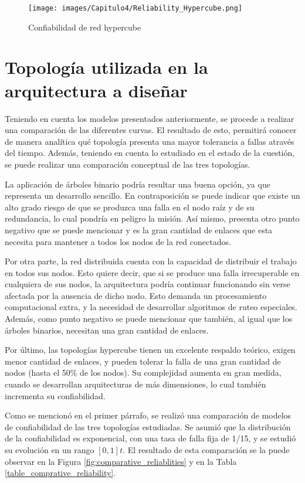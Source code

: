 \begin{figure}[H]
 \centering
 \texttt{[image: images/Capitulo4/Reliability\_Hypercube.png]}
  \caption{Confiabilidad de red hypercube}
\label{fig:Reliability_Hypercube}
\end{figure}

\section{Topología utilizada en la arquitectura a diseñar}

Teniendo en cuenta los modelos presentados anteriormente, se procede a realizar una comparación de las diferentes curvas. El resultado de esto, permitirá conocer de manera analítica qué topología presenta una mayor tolerancia a fallas através del tiempo. Además, teniendo en cuenta lo estudiado en el estado de la cuestión, se puede realizar una comparación conceptual de las tres topologías.

La aplicación de árboles binario podría resultar una buena opción, ya que representa un desarrollo sencillo. En contraposición se puede indicar que existe un alto grado riesgo de que se produzca una falla en el nodo raíz y de su redundancia, lo cual pondría en peligro la misión. Así mismo, presenta otro punto negativo que se puede mencionar y es la gran cantidad de enlaces que esta necesita para mantener a todos los nodos de la red conectados.

Por otra parte, la red distribuida cuenta con la capacidad de distribuir el trabajo en todos sus nodos. Esto quiere decir, que si se produce una falla irrecuperable en cualquiera de sus nodos, la arquitectura podría continuar funcionando sin verse afectada por la ausencia de dicho nodo. Esto demanda un procesamiento computacional extra, y la necesidad de desarrollar algoritmos de ruteo especiales. Además, como punto negativo se puede mencionar que también, al igual que los árboles binarios, necesitan una gran cantidad de enlaces.

Por último, las topologías hypercube tienen un excelente respaldo teórico, exigen menor cantidad de enlaces, y pueden tolerar la falla de una gran cantidad de nodos (hasta el 50\% de los nodos). Su complejidad aumenta en gran medida, cuando se desarrollan arquitecturas de más dimensiones, lo cual también incrementa su confiabilidad.

Como se mencionó en el primer párrafo, se realizó una comparación de modelos de confiabilidad de las tres topologías estudiadas. Se asumió que la distribución de la confiabilidad es exponencial, con una tasa de falla fija de 1/15, y se estudió su evolución en un rango $[0,1]t$. El resultado de esta comparación se la puede observar en la Figura \ref{fig:comparative_reliablities} y en la Tabla \ref{table_comprative_reliability}.

